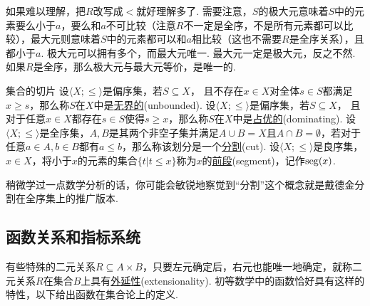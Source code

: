 如果难以理解，把\(R\)改写成\(<\)就好理解多了. 需要注意，\(S\)的极大元意味着\(S\)中的元素要么小于\(a\)，要么和\(a\)不可比较（注意\(R\)不一定是全序，不是所有元素都可以比较），最大元则意味着\(S\)中的元素都可以和\(a\)相比较（这也不需要\(R\)是全序关系），且都小于\(a\). 极大元可以拥有多个，而最大元唯一. 最大元一定是极大元，反之不然. 如果\(R\)是全序，那么极大元与最大元等价，是唯一的. 

\begin{definition}{集合的切片}
    设\(\langle X; \leq \rangle\)是偏序集，若\(S \subseteq X\)，{\color{red} 且不存在\(x \in X\)对全体\(s \in S\)都满足\(x \geq s\)}，那么称\(S\)在\(X\)中是\underline{无界的}(unbounded). \newline
    设\(\langle X; \leq \rangle\)是偏序集，若\(S \subseteq X\)，{\color{red} 且对于任意\(x \in X\)都存在\(s \in S\)使得\(s \geq x\)}，那么称\(S\)在\(X\)中是\underline{占优的}(dominating). \newline
    设\(\langle X; \leq \rangle\)是全序集，\(A,B\)是其两个非空子集并满足\(A \cup B = X\)且\(A \cap B = \emptyset\)，若对于任意\(a \in A, b \in B\)都有\(a \leq b\)，那么称该划分是一个\underline{分割}(cut). \newline
    设\(\langle X; \leq \rangle\)是良序集，\(x \in X\)，将小于\(x\)的元素的集合\(\{t | t\leq x\}\)称为\(x\)的\underline{前段}(segment)，记作\({\rm seg}(x)\).
\end{definition}
稍微学过一点数学分析的话，你可能会敏锐地察觉到“分割”这个概念就是戴德金分割在全序集上的推广版本.
\subsection{函数关系和指标系统}

有些特殊的二元关系\(R \subseteq A \times B\)，只要左元确定后，右元也能唯一地确定，就称二元关系\(R\)在集合\(B\)上具有\underline{外延性}(extensionality). 初等数学中的函数恰好具有这样的特性，以下给出函数在集合论上的定义.

